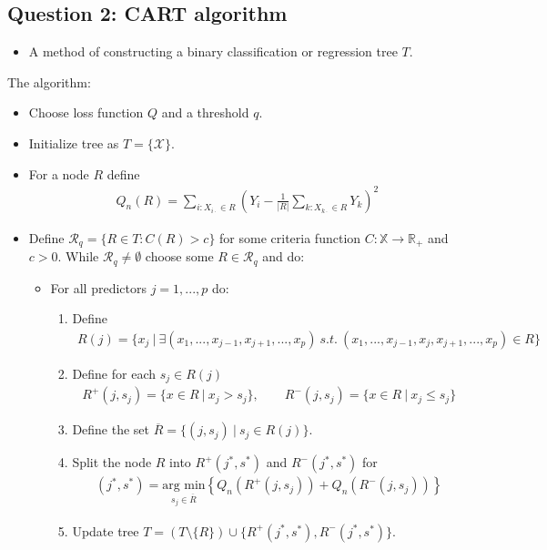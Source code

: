\documentclass[
]{book}
\providecommand{\tightlist}{%
  \setlength{\itemsep}{0pt}\setlength{\parskip}{0pt}}
\begin{document}
\hypertarget{question-2-cart-algorithm}{%
\subsection{Question 2: CART algorithm}\label{question-2-cart-algorithm}}

\begin{itemize}
\tightlist
\item
  A method of constructing a binary classification or regression tree \(T\).
\end{itemize}

The algorithm:

\begin{itemize}
\tightlist
\item
  Choose loss function \(Q\) and a threshold \(q\).
\item
  Initialize tree as \(T=\{\mathcal X\}\).
\item
  For a node \(R\) define
  \begin{align*}
    Q_n(R)=\sum_{i : X_{i\cdot} \in R}\left( Y_i - \frac{1}{\vert R\vert}\sum_{k : X_{k\cdot}\in R} Y_k\right)^2
    \end{align*}
\item
  Define \(\mathcal R_q=\{R\in T : C(R)>c\}\) for some criteria function \(C : \mathbb X\to\mathbb R_+\) and \(c>0\). While \(\mathcal R_q\ne \emptyset\) choose some \(R\in \mathcal R_q\) and do:

  \begin{itemize}
  \tightlist
  \item
    For all predictors \(j=1,...,p\) do:

    \begin{enumerate}
    \def\labelenumi{(\alph{enumi})}
    \tightlist
    \item
      Define
      \begin{align*}
      R(j)=\{x_j\ \vert\ \exists (x_1,...,x_{j-1},x_{j+1},...,x_p)\ s.t.\ (x_1,...,x_{j-1},x_j,x_{j+1},...,x_p)\in R \}
      \end{align*}
    \item
      Define for each \(s_j\in R(j)\)
      \begin{align*}
      R^+(j,s_j)=\{x\in R\ \vert\ x_j> s_j\},\qquad R^-(j,s_j)=\{x\in R\ \vert\ x_j\le s_j\}
      \end{align*}
    \item
      Define the set \(\overline R=\{(j,s_j)\ \vert\ s_j\in R(j)\}\).
    \item
      Split the node \(R\) into \(R^+(j^*,s^*)\) and \(R^-(j^*,s^*)\) for
      \begin{align*}
      (j^*,s^*)=\underset{s_j\in \overline R}{\text{arg min}}\left\{ Q_n(R^+(j,s_j))+Q_n(R^-(j,s_j))\right\}
      \end{align*}
    \item
      Update tree \(T=(T\setminus \{R\})\cup \{R^+(j^*,s^*),R^-(j^*,s^*)\}\).
    \end{enumerate}
  \end{itemize}
\end{itemize}
\end{document}
